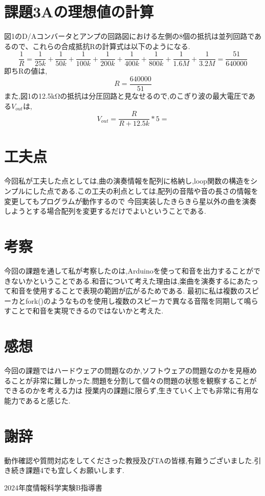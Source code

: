 \documentclass[dvipdfmx]{jarticle}
\begin{document}
\section{課題3Aの理想値の計算}
図1のD/Aコンバータとアンプの回路図における左側の8個の抵抗は並列回路であるので、これらの合成抵抗Rの計算式は以下のようになる.
\begin{equation}
\frac{1}{R}=\frac{1}{25k}+\frac{1}{50k}+\frac{1}{100k}+\frac{1}{200k}+\frac{1}{400k}+\frac{1}{800k}+\frac{1}{1.6M}+\frac{1}{3.2M}=\frac{51}{640000}
\end{equation}
即ちRの値は,
\begin{equation}
    R=\frac{640000}{51}
\end{equation}
また,図1の12.5kΩの抵抗は分圧回路と見なせるので\cite{0},のこぎり波の最大電圧である$V_{out}$は,
\begin{equation}
    V_{out} = \frac{R}{R+12.5k}*5 = 
\end{equation}
\section{工夫点}
今回私が工夫した点としては,曲の演奏情報を配列に格納し,loop関数の構造をシンプルにした点である.この工夫の利点としては,配列の音階や音の長さの情報を変更してもプログラムが動作するので
今回実装したきらきら星以外の曲を演奏しようとする場合配列を変更するだけでよいということである.
\section{考察}
今回の課題を通して私が考察したのは,Arduinoを使って和音を出力することができないかということである.和音について考えた理由は,楽曲を演奏するにあたって和音を使用することで表現の範囲が広がるためである.
最初に私は複数のスピーカとfork()のようなものを使用し複数のスピーカで異なる音階を同期して鳴らすことで和音を実現できるのではないかと考えた.
\section{感想}
今回の課題ではハードウェアの問題なのか,ソフトウェアの問題なのかを見極めることが非常に難しかった.問題を分割して個々の問題の状態を観察することができるのかを考える力は
授業内の課題に限らず,生きていく上でも非常に有用な能力であると感じた.
\section{謝辞}
動作確認や質問対応をしてくださった教授及びTAの皆様,有難うございました.引き続き課題4でも宜しくお願いします.
\begin{thebibliography}{99}
     2024年度情報科学実験B指導書
\end{thebibliography}
\end{document}

